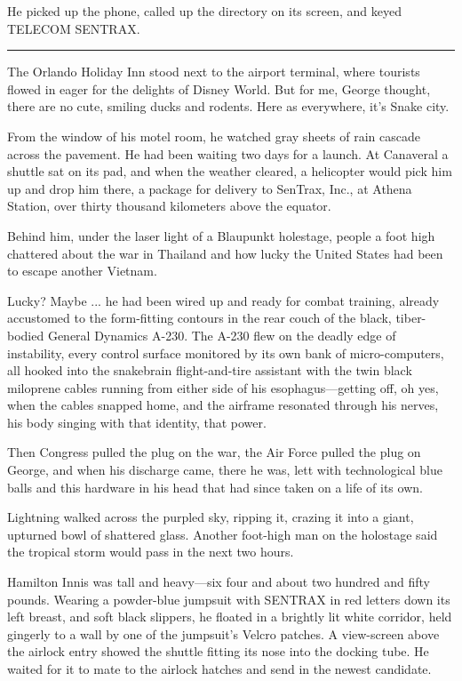 He picked up the phone, called up the directory on its screen, and keyed TELECOM SENTRAX.

\fancybreak{* * *}

The Orlando Holiday Inn stood next to the airport terminal, where tourists flowed in eager for the delights of Disney World. But for me, George thought, there are no cute, smiling ducks and rodents. Here as everywhere, it's Snake city.

From the window of his motel room, he watched gray sheets of rain cascade across the pavement. He had been waiting two days for a launch. At Canaveral a shuttle sat on its pad, and when the weather cleared, a helicopter would pick him up and drop him there, a package for delivery to SenTrax, Inc., at Athena Station, over thirty thousand kilometers above the equator.

Behind him, under the laser light of a Blaupunkt holestage, people a foot high chattered about the war in Thailand and how lucky the United States had been to escape another Vietnam.

Lucky? Maybe ... he had been wired up and ready for combat training, already accustomed to the form-fitting contours in the rear couch of the black, tiber-bodied General Dynamics A-230. The A-230 flew on the deadly edge of instability, every control surface monitored by its own bank of micro-computers, all hooked into the snakebrain flight-and-tire assistant with the twin black miloprene cables running from either side of his esophagus—getting off, oh yes, when the cables snapped home, and the airframe resonated through his nerves, his body singing with that identity, that power.

Then Congress pulled the plug on the war, the Air Force pulled the plug on George, and when his discharge came, there he was, lett with technological blue balls and this hardware in his head that had since taken on a life of its own.

Lightning walked across the purpled sky, ripping it, crazing it into a giant, upturned bowl of shattered glass. Another foot-high man on the holostage said the tropical storm would pass in the next two hours.

Hamilton Innis was tall and heavy—six four and about two hundred and fifty pounds. Wearing a powder-blue jumpsuit with SENTRAX in red letters down its left breast, and soft black slippers, he floated in a brightly lit white corridor, held gingerly to a wall by one of the jumpsuit's Velcro patches. A view-screen above the airlock entry showed the shuttle fitting its nose into the docking tube. He waited for it to mate to the airlock hatches and send in the newest candidate.

